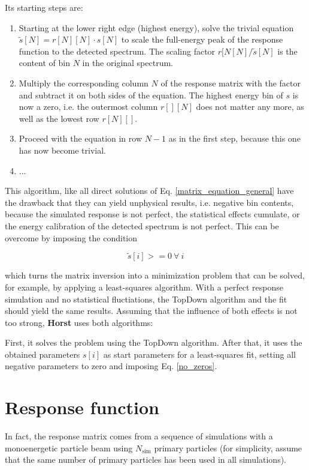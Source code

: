 \documentclass{article}
\begin{document}
Its starting steps are:

\begin{enumerate}
	\item{Starting at the lower right edge (highest energy), solve the trivial equation $\tilde{s}[N] = r[N][N] \cdot s[N]$ to scale the full-energy peak of the response function to the detected spectrum. 
		The scaling factor $r[N[N]/\tilde{s}[N]$ is the content of bin $N$ in the original spectrum.}
	\item{Multiply the corresponding column $N$ of the response matrix with the factor and subtract it on both sides of the equation. The highest energy bin of $s$ is now a zero, i.e. the outermost column $r[][N]$ does not matter any more, as well as the lowest row $r[N][]$.}
	\item{Proceed with the equation in row $N-1$ as in the first step, because this one has now become trivial.}
	\item{...}
\end{enumerate}

This algorithm, like all direct solutions of Eq. \ref{matrix_equation_general} have the drawback that they can yield unphysical results, i.e. negative bin contents, because the simulated response is not perfect, the statistical effects cumulate, or the energy calibration of the detected spectrum is not perfect.
This can be overcome by imposing the condition

\begin{equation}
	\label{no_zeros}
	\tilde{s}[i] >= 0 ~ \forall ~ i
\end{equation}

which turns the matrix inversion into a minimization problem that can be solved, for example, by applying a least-squares algorithm.
With a perfect response simulation and no statistical fluctiations, the TopDown algorithm and the fit should yield the same results.
Assuming that the influence of both effects is not too strong, \textbf{Horst} uses both algorithms: 

First, it solves the problem using the TopDown algorithm. After that, it uses the obtained parameters $s[i]$ as start parameters for a least-squares fit, setting all negative parameters to zero and imposing Eq. \ref{no_zeros}.

\section{Response function}
In fact, the response matrix comes from a sequence of simulations with a monoenergetic particle beam using $N_\mathrm{sim}$ primary particles (for simplicity, assume that the same number of primary particles has been used in all simulations).
\end{document}
